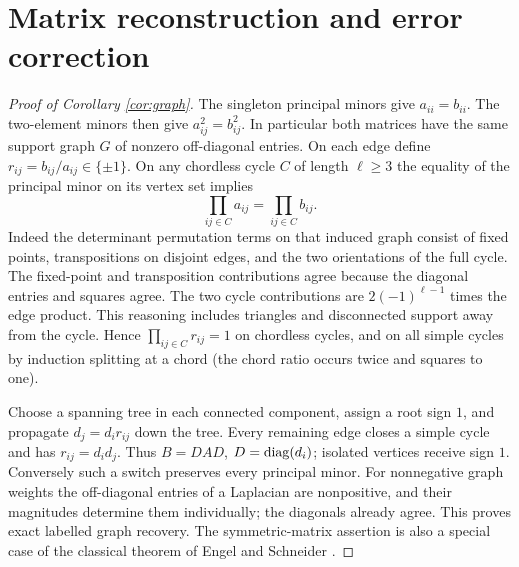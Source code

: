 \documentclass[11pt]{article}
\theoremstyle{definition}\newtheorem{definition}[theorem]{Definition}
\begin{document}
\section{Matrix reconstruction and error correction}
\begin{proof}[Proof of Corollary \ref{cor:graph}]
The singleton principal minors give $a_{ii}=b_{ii}$. The two-element minors then give $a_{ij}^2=b_{ij}^2$. In particular both matrices have the same support graph $G$ of nonzero off-diagonal entries. On each edge define $r_{ij}=b_{ij}/a_{ij}\in\{\pm1\}$. On any chordless cycle $C$ of length $\ell\ge3$ the equality of the principal minor on its vertex set implies
\[
                       \prod_{ij\in C}a_{ij}=\prod_{ij\in C}b_{ij}.
\]
Indeed the determinant permutation terms on that induced graph consist of fixed points, transpositions on disjoint edges, and the two orientations of the full cycle. The fixed-point and transposition contributions agree because the diagonal entries and squares agree. The two cycle contributions are $2(-1)^{\ell-1}$ times the edge product. This reasoning includes triangles and disconnected support away from the cycle. Hence $\prod_{ij\in C}r_{ij}=1$ on chordless cycles, and on all simple cycles by induction splitting at a chord (the chord ratio occurs twice and squares to one).

Choose a spanning tree in each connected component, assign a root sign $1$, and propagate $d_j=d_i r_{ij}$ down the tree. Every remaining edge closes a simple cycle and has $r_{ij}=d_i d_j$. Thus $B=DAD$, $D=\operatorname{diag}(d_i)$; isolated vertices receive sign $1$. Conversely such a switch preserves every principal minor. For nonnegative graph weights the off-diagonal entries of a Laplacian are nonpositive, and their magnitudes determine them individually; the diagonals already agree. This proves exact labelled graph recovery. The symmetric-matrix assertion is also a special case of the classical theorem of Engel and Schneider \cite{engel}.
\end{proof}
\end{document}
